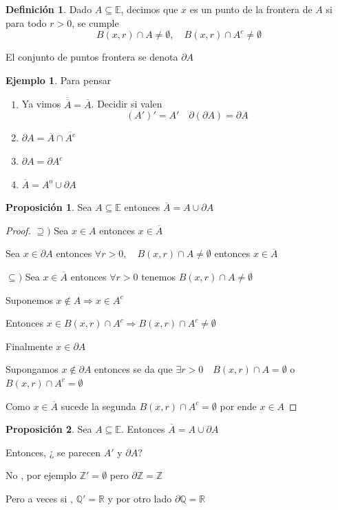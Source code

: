 \documentclass[12pt]{article}
\newcommand{\Z}{\mathbb{Z}}
\newcommand{\Q}{\mathbb{Q}}
\newcommand{\R}{\mathbb{R}}
\newcommand{\E}{\mathbb{E}}
\newcommand{\Ra}{\Rightarrow}
\newcommand{\ol}{\overline}
\newcommand{\open}{\mathrm{o}}
\theoremstyle{definition}
\newtheorem{definition}{Definición}[section]
\newtheorem{prop}{Proposición}
\newtheorem{ex}{Ejemplo}
\begin{document}
\begin{definition}
  Dado $A \subseteq \E$, decimos que $x$ es un punto de la frontera de $A$ si para todo $r>0$, se cumple
  $$ B(x,r) \cap A \neq \emptyset , \quad B(x,r) \cap A^c \neq \emptyset$$

  El conjunto de puntos frontera se denota $\partial A$
\end{definition}

\begin{ex} Para pensar 


  \begin{enumerate}
    \item  Ya vimos $\ol{\ol A} = \ol A$. Decidir si valen
$$ (A')' = A' \quad \partial (\partial A)= \partial A$$

    \item  $\partial A = \ol A \cap \ol{A^c}$

    \item $\partial A = \partial A^c$

    \item $\ol A = A^{\open} \cup \partial A$

\end{enumerate}
\end{ex}

\begin{prop}
  Sea $A \subseteq \E$ entonces $\ol A = A \cup \partial A$

  \begin{proof}
  $\supseteq )$ Sea $x \in A$ entonces $x \in \ol A$ 

  Sea $x \in \partial A$ entonces $\forall r>0, \quad B(x,r) \cap A \neq \emptyset$ entonces $x \in \ol A$
  
  $\subseteq ) $ Sea $x \in \ol A$ entonces $\forall r > 0$ tenemos $ B(x,r) \cap A \neq \emptyset$

  Suponemos $x \notin A \Ra x \in A^c$

  Entonces $x \in B(x,r) \cap A^c \Ra B(x,r) \cap A^c \neq \emptyset$ 

  Finalmente $x \in \partial A$ 

  Supongamos $x \notin \partial A$ entonces se da que $\exists r > 0 \quad B(x,r) \cap A = \emptyset$ o $B(x,r) \cap A^c = \emptyset$ 

  Como $x \in \ol A$ sucede la segunda $B(x,r) \cap A^c = \emptyset$ por ende $x \in A$
\end{proof}
\end{prop}

\begin{prop}
  Sea $A \subseteq \E$. Entonces $\ol A = A \cup \partial A$

  Entonces, ¿ se parecen $A'$ y $\partial A$?

  No , por ejemplo $\Z ' = \emptyset$ pero $\partial \Z = \Z$

  Pero a veces si , $\Q ' = \R$ y por otro lado $\partial \Q = \R$
\end{prop}
\end{document}
